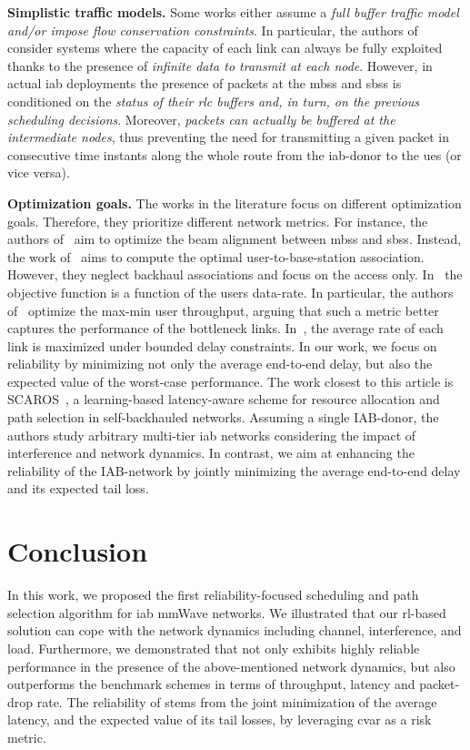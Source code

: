 \textbf{Simplistic traffic models.} Some works either assume a \textit{full buffer traffic model and/or impose flow conservation constraints}. In particular, the authors of~\cite{yuan2018optimal, rasekh2015interference} consider systems where the capacity of each link can  always be fully exploited thanks to the presence of \textit{infinite data to transmit at each node}. However, in actual \gls{iab} deployments the presence of packets at the \glspl{mbs} and \glspl{sbs} is conditioned on the \textit{status of their \gls{rlc} buffers and, in turn, on the previous scheduling decisions}. Moreover, \textit{packets can actually be buffered at the intermediate nodes}, thus preventing the need for transmitting a given packet in consecutive time instants along the whole route from the \gls{iab}-donor to the \glspl{ue} (or vice versa). 

\textbf{Optimization goals.} The works in the literature focus on different optimization goals. Therefore, they prioritize different network metrics. For instance, the authors of~\cite{hur2013millimeter} aim to optimize the beam alignment between \glspl{mbs} and \glspl{sbs}. Instead, the work of~\cite{alizadeh2019load} aims to compute the optimal user-to-base-station association. However, they neglect backhaul associations and focus on the access only. In~\cite{kwon2019joint, alizadeh2019load, zhu2016qos, yuan2018optimal} the objective function is a function of the users data-rate. In particular, the authors of~\cite{yuan2018optimal} optimize the max-min user throughput, arguing that such a metric better captures the performance of the bottleneck links. In~\cite{vu2018path}, the average rate of each link is maximized under bounded delay constraints. In our work, we focus on reliability by minimizing not only the average end-to-end delay, but also the expected value of the worst-case performance.
The work closest to this article is SCAROS~\cite{ortiz2019scaros},  a learning-based latency-aware scheme for resource allocation and path selection in self-backhauled networks. Assuming a single IAB-donor, the authors study arbitrary multi-tier \gls{iab} networks considering the impact of interference and network dynamics. In contrast, we aim at enhancing the reliability of the IAB-network by jointly minimizing the average end-to-end delay and its expected tail loss. 

\section{Conclusion}
\label{s:conclusion}
In this work, we proposed the first reliability-focused scheduling and path selection algorithm for \gls{iab} mmWave networks. We illustrated that our \gls{rl}-based solution can cope with the network dynamics including channel, interference, and load.  Furthermore, we demonstrated that \name{} not only  exhibits highly reliable performance in the presence of the above-mentioned network dynamics, but also outperforms the benchmark schemes in terms of throughput, latency and packet-drop rate. The reliability of \name{} stems from the joint minimization of the average latency, and the expected value of its tail losses, by leveraging \gls{cvar} as a risk metric.




